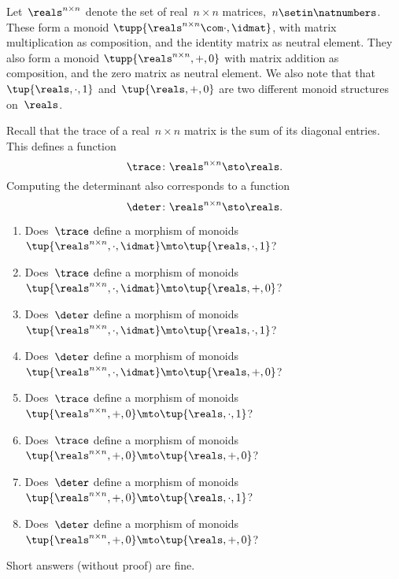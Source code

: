 \begin{gradedexercise}
    \label{ex:TraceAndDeterminant}
    Let~$\reals^{n \times n}$ denote the set of real~$n \times n$ matrices,~$n \setin \natnumbers$.
    These form a monoid $\tupp{\reals^{n \times n}\com \cdot, \idmat}$, with matrix multiplication as composition, and the identity matrix as neutral element.
    They also form a monoid $\tupp{\reals^{n \times n}, {{+}}, 0}$ with matrix addition as composition, and the zero matrix as neutral element.
    We also note that that~$\tup{\reals, {{\cdot}}, 1}$ and~$\tup{\reals, {{+}}, 0}$ are two different monoid structures on~$\reals$.

    Recall that the trace of a real~$n \times n$ matrix is the sum of its diagonal entries.
    This defines a function
    \begin{equation}
        \trace \colon \reals^{n \times n} \sto \reals.
    \end{equation}
    Computing the determinant also corresponds to a function
    \begin{equation}
        \deter \colon \reals^{n \times n} \sto \reals.
    \end{equation}

    \begin{enumerate}
        \item Does~$\trace$ define a morphism of monoids~$\tup{\reals^{n \times n}, {{\cdot}},  \idmat} \mto \tup{\reals, {{\cdot}},  1}$?
        \item Does~$\trace$ define a morphism of monoids~$\tup{\reals^{n \times n}, {{\cdot}},  \idmat} \mto \tup{\reals, {{+}},  0}$?
        \item Does~$\deter$ define a morphism of monoids~$\tup{\reals^{n \times n}, {{\cdot}},  \idmat} \mto \tup{\reals, {{\cdot}},  1}$?
        \item Does~$\deter$ define a morphism of monoids~$\tup{\reals^{n \times n}, {{\cdot}},  \idmat} \mto \tup{\reals, {{+}},  0}$?
        \item Does~$\trace$ define a morphism of monoids~$\tup{\reals^{n \times n}, {{+}},  0} \mto \tup{\reals, {{\cdot}},  1}$?
        \item Does~$\trace$ define a morphism of monoids~$\tup{\reals^{n \times n}, {{+}},  0} \mto \tup{\reals, {{+}},  0}$?
        \item Does~$\deter$ define a morphism of monoids~$\tup{\reals^{n \times n}, {{+}},  0} \mto \tup{\reals, {{\cdot}},  1}$?
        \item Does~$\deter$ define a morphism of monoids~$\tup{\reals^{n \times n}, {{+}},  0} \mto \tup{\reals, {{+}},  0}$?
    \end{enumerate}
    Short answers (without proof) are fine.
\end{gradedexercise}

